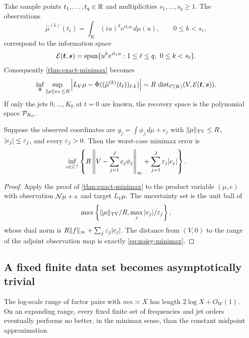 Take sample points $t_1,\ldots,t_q\in\mathbb R$ and multiplicities
$s_1,\ldots,s_q\geq1$.  The observations
\begin{equation}\label{eq:Mellin-jet-data}
 \widehat\mu^{(k)}(t_\ell)
 =\int_K(iu)^ke^{it_\ell u}\,d\mu(u),
 \qquad 0\leq k<s_\ell,
\end{equation}
correspond to the information space
\begin{equation}\label{eq:exponential-polynomial-space}
 \mathcal E(\boldsymbol t,\boldsymbol s)
 =\operatorname{span}\{u^ke^{it_\ell u}:
 1\leq\ell\leq q,\ 0\leq k<s_\ell\}.
\end{equation}
Consequently \cref{thm:exact-minimax} becomes
\begin{equation}\label{eq:Mellin-minimax-distance}
 \inf_\Phi\sup_{\|\mu\|_{\mathrm{TV}}\leq R}
 \left|L_V\mu-\Phi((\widehat\mu^{(k)}(t_\ell))_{\ell,k})\right|
 =R\,\operatorname{dist}_{C(K)}(V,\mathcal E(\boldsymbol t,\boldsymbol s)).
\end{equation}
If only the jets $0,\ldots,K_0$ at $t=0$ are known, the recovery space is
the polynomial space $\mathcal P_{K_0}$.

\begin{proposition}
\label{prop:noisy-minimax}
Suppose the observed coordinates are
\(
 y_j=\int\phi_j\,d\mu+e_j
\)
with $\|\mu\|_{\mathrm{TV}}\leq R$, $|e_j|\leq\varepsilon_j$, and every $\varepsilon_j>0$.
Then the worst-case
minimax error is
\begin{equation}\label{eq:noisy-minimax}
 \inf_{c\in\mathbb C^J}
 \left\{
 R\left\|V-\sum_{j=1}^Jc_j\phi_j\right\|_\infty
 +\sum_{j=1}^J\varepsilon_j|c_j|
 \right\}.
\end{equation}
\end{proposition}

\begin{proof}
Apply the proof of \cref{thm:exact-minimax} to the product variable
$(\mu,e)$ with observation $\mathcal N\mu+e$ and target $L_V\mu$.  The uncertainty
set is the unit ball of
\[
 \max\left\{\|\mu\|_{\mathrm{TV}}/R,
             \max_j|e_j|/\varepsilon_j\right\},
\]
whose dual norm is
$R\|f\|_\infty+\sum_j\varepsilon_j|c_j|$.  The distance from $(V,0)$ to the
range of the adjoint observation map is exactly
\eqref{eq:noisy-minimax}.
\end{proof}

\subsection{A fixed finite data set becomes asymptotically trivial}

The log-scale range of factor pairs with $mn\asymp X$ has length
$2\log X+O_W(1)$.  On an expanding range, every fixed finite set of
frequencies and jet orders eventually performs no better, in the minimax
sense, than the constant midpoint approximation.

